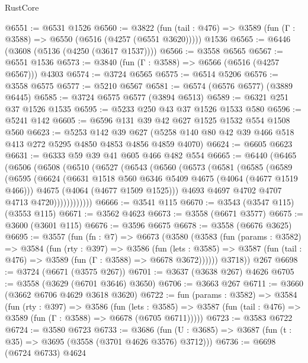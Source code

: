 \begin{lexlean}{RustCore}
\begin{coremodule}
@6551 := @6531 @1526
@6560 := @3822
    (fun (tail : @476) => @3589 (fun (Γ : @3588) => @6550 (@6516 (@4257 (@6551 @3620)))))
    @1536
@6565 := @6446 (@3608 (@5136 (@4250 (@3617 @1537))))
@6566 := @3558 @6565
@6567 := @6551 @1536
@6573 := @3840 (fun (Γ : @3588) => @6566 (@6516 (@4257 @6567))) @4303
@6574 := @3724 @6565
@6575 := @6514 @5206
@6576 := @3558 @6575
@6577 := @5210 @6567
@6581 := @6574 (@6576 @6577) (@3889 @6445)
@6585 := @3724 @6575 @6577 (@3894 @6513)
@6589 := @6321 @251 @37 @1526 @1535
@6595 := @5233 @250 @43 @37 @1526 @1533 @580
@6596 := @5241 @142
@6605 := @6596 @131 @39 @42 @627 @1525 @1532 @554 @1508 @560
@6623 := @5253
    @142
    @39
    @627
    (@5258 @140 @80 @42 @39 @466 @518 @413 @272 @5295 @4850 @4853 @4856 @4859 @4070)
@6624 := @6605 @6623
@6631 := @6333 @59 @39 @41 @605 @466 @482 @554
@6665 := @6440
    (@6465
      (@6506
        (@6508
          (@6510
            (@6527
              (@6543
                (@6560
                  (@6573
                    (@6581
                      (@6585
                        (@6589
                          (@6595
                            (@6624
                              (@6631 @1518 @560 @6346 @5409 @4675 (@4064 (@4677 @1519 @466)))
                              @4675
                              (@4064 (@4677 @1509 @1525)))
                            @4693
                            @4697
                            @4702
                            @4707
                            @4713
                            @4720))))))))))))
@6666 := @3541 @115
@6670 := @3543 (@3547 @115) (@3553 @115)
@6671 := @3562 @4623
@6673 := @3558 (@6671 @3577)
@6675 := @3600 (@3601 @115)
@6676 := @3596 @6675
@6678 := @3558 (@6676 @3625)
@6695 := @3557
    (fun (fn : @7) =>
    @6673
      (@3580
        (@3583
          (fun (params : @3582) =>
          @3584
            (fun (rty : @397) =>
            @3586
              (fun (lets : @3585) =>
              @3587 (fun (tail : @476) => @3589 (fun (Γ : @3588) => @6678 @3672))))))
        @3718))
    @267
@6698 := @3724 (@6671 (@3575 @267))
@6701 := @3637 (@3638 @267) @4626
@6705 := @3558 (@3629 (@6701 @3646) @3650)
@6706 := @3663 @267
@6711 := @3660 (@3662 @6706 @4629 @3618 @3620)
@6722 := fun (params : @3582) =>
  @3584
    (fun (rty : @397) =>
    @3586
      (fun (lets : @3585) =>
      @3587 (fun (tail : @476) => @3589 (fun (Γ : @3588) => @6678 (@6705 @6711)))))
@6723 := @3583 @6722
@6724 := @3580 @6723
@6733 := @3686 (fun (U : @3685) => @3687 (fun (t : @35) => @3695 (@3558 (@3701 @4626 @3576) @3712)))
@6736 := @6698 (@6724 @6733) @4624

\end{coremodule}
\end{lexlean}
